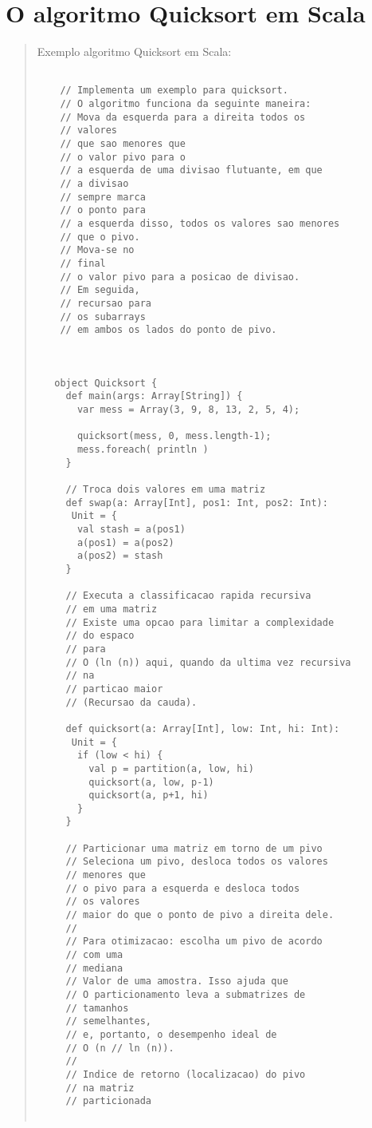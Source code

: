 \section{O algoritmo Quicksort em Scala}
\begin{quote}
  \hspace{2.5mm}Exemplo algoritmo Quicksort em Scala:
  \cite{alexander2013scala}

  \begin{lstlisting}

    // Implementa um exemplo para quicksort.
    // O algoritmo funciona da seguinte maneira:
    // Mova da esquerda para a direita todos os
    // valores
    // que sao menores que
    // o valor pivo para o
    // a esquerda de uma divisao flutuante, em que
    // a divisao
    // sempre marca
    // o ponto para
    // a esquerda disso, todos os valores sao menores
    // que o pivo.
    // Mova-se no
    // final
    // o valor pivo para a posicao de divisao.
    // Em seguida,
    // recursao para
    // os subarrays
    // em ambos os lados do ponto de pivo.



   object Quicksort {
     def main(args: Array[String]) {
       var mess = Array(3, 9, 8, 13, 2, 5, 4);

       quicksort(mess, 0, mess.length-1);
       mess.foreach( println )
     }

     // Troca dois valores em uma matriz
     def swap(a: Array[Int], pos1: Int, pos2: Int):
      Unit = {
       val stash = a(pos1)
       a(pos1) = a(pos2)
       a(pos2) = stash
     }

     // Executa a classificacao rapida recursiva
     // em uma matriz
     // Existe uma opcao para limitar a complexidade
     // do espaco
     // para
     // O (ln (n)) aqui, quando da ultima vez recursiva
     // na
     // particao maior
     // (Recursao da cauda).

     def quicksort(a: Array[Int], low: Int, hi: Int):
      Unit = {
       if (low < hi) {
         val p = partition(a, low, hi)
         quicksort(a, low, p-1)
         quicksort(a, p+1, hi)
       }
     }

     // Particionar uma matriz em torno de um pivo
     // Seleciona um pivo, desloca todos os valores
     // menores que
     // o pivo para a esquerda e desloca todos
     // os valores
     // maior do que o ponto de pivo a direita dele.
     //
     // Para otimizacao: escolha um pivo de acordo
     // com uma
     // mediana
     // Valor de uma amostra. Isso ajuda que
     // O particionamento leva a submatrizes de
     // tamanhos
     // semelhantes,
     // e, portanto, o desempenho ideal de
     // O (n // ln (n)).
     //
     // Indice de retorno (localizacao) do pivo
     // na matriz
     // particionada


\end{lstlisting}
\end{quote}
